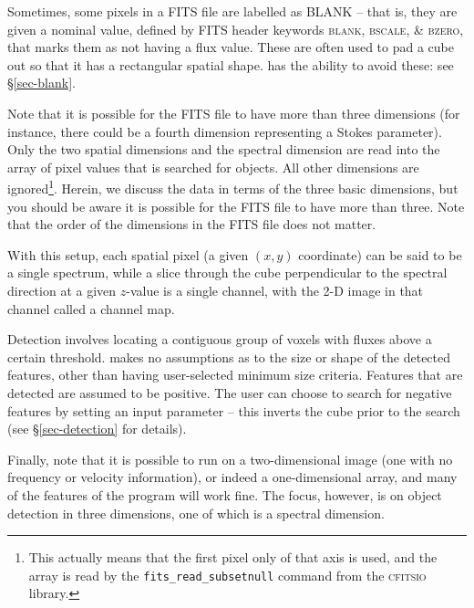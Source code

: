 Sometimes, some pixels in a FITS file are labelled as BLANK -- that
is, they are given a nominal value, defined by FITS header keywords
\textsc{blank, bscale, \& bzero}, that marks them as not having a flux
value. These are often used to pad a cube out so that it has a
rectangular spatial shape. \duchamp has the ability to avoid these:
see \S\ref{sec-blank}.

Note that it is possible for the FITS file to have more than three
dimensions (for instance, there could be a fourth dimension
representing a Stokes parameter). Only the two spatial dimensions and
the spectral dimension are read into the array of pixel values that is
searched for objects. All other dimensions are ignored\footnote{This
actually means that the first pixel only of that axis is used, and the
array is read by the \texttt{fits\_read\_subsetnull} command from the
\textsc{cfitsio} library.}. Herein, we discuss the data in terms of
the three basic dimensions, but you should be aware it is possible for
the FITS file to have more than three. Note that the order of the
dimensions in the FITS file does not matter.

With this setup, each spatial pixel (a given $(x,y)$ coordinate) can
be said to be a single spectrum, while a slice through the cube
perpendicular to the spectral direction at a given $z$-value is a
single channel, with the 2-D image in that channel called a channel
map.

Detection involves locating a contiguous group of voxels with fluxes
above a certain threshold. \duchamp makes no assumptions as to the
size or shape of the detected features, other than having
user-selected minimum size criteria. Features that are detected are
assumed to be positive. The user can choose to search for negative
features by setting an input parameter -- this inverts the cube prior
to the search (see \S\ref{sec-detection} for details).

Finally, note that it is possible to run \duchamp on a
two-dimensional image (\ie one with no frequency or velocity
information), or indeed a one-dimensional array, and many of the
features of the program will work fine. The focus, however, is on
object detection in three dimensions, one of which is a spectral
dimension.


